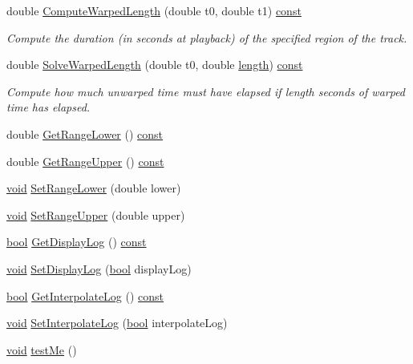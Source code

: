 \begin{DoxyCompactItemize}
$$double \hyperlink{class_time_track_ad8a3efc750c22ca2387d4ea41343c86b}{Compute\+Warped\+Length} (double t0, double t1) \hyperlink{getopt1_8c_a2c212835823e3c54a8ab6d95c652660e}{const} 
\begin{DoxyCompactList}\small\item\em Compute the duration (in seconds at playback) of the specified region of the track. \end{DoxyCompactList}\item 
double \hyperlink{class_time_track_a76fa0dc4d125c058f9d7ae580bd07c28}{Solve\+Warped\+Length} (double t0, double \hyperlink{test__lib_f_l_a_c_2format_8c_ac94dc16b22556ba5fa815655f27442da}{length}) \hyperlink{getopt1_8c_a2c212835823e3c54a8ab6d95c652660e}{const} 
\begin{DoxyCompactList}\small\item\em Compute how much unwarped time must have elapsed if length seconds of warped time has elapsed. \end{DoxyCompactList}\item 
double \hyperlink{class_time_track_a4b1f56611ba90a95691a0b47107e4d22}{Get\+Range\+Lower} () \hyperlink{getopt1_8c_a2c212835823e3c54a8ab6d95c652660e}{const} 
\item 
double \hyperlink{class_time_track_a8d16c30d6a49657b1e3125ba16a3fae8}{Get\+Range\+Upper} () \hyperlink{getopt1_8c_a2c212835823e3c54a8ab6d95c652660e}{const} 
\item 
\hyperlink{sound_8c_ae35f5844602719cf66324f4de2a658b3}{void} \hyperlink{class_time_track_aa5896d68ea4f71d80c7cda10438394a7}{Set\+Range\+Lower} (double lower)
\item 
\hyperlink{sound_8c_ae35f5844602719cf66324f4de2a658b3}{void} \hyperlink{class_time_track_aff49fb8cb170a1b8343ed719abb96e49}{Set\+Range\+Upper} (double upper)
\item 
\hyperlink{mac_2config_2i386_2lib-src_2libsoxr_2soxr-config_8h_abb452686968e48b67397da5f97445f5b}{bool} \hyperlink{class_time_track_abae5d14db9f5a3f3ffc6c6c99278ed3a}{Get\+Display\+Log} () \hyperlink{getopt1_8c_a2c212835823e3c54a8ab6d95c652660e}{const} 
\item 
\hyperlink{sound_8c_ae35f5844602719cf66324f4de2a658b3}{void} \hyperlink{class_time_track_a3a7af38b8f18f64cf2939d97c634ac37}{Set\+Display\+Log} (\hyperlink{mac_2config_2i386_2lib-src_2libsoxr_2soxr-config_8h_abb452686968e48b67397da5f97445f5b}{bool} display\+Log)
\item 
\hyperlink{mac_2config_2i386_2lib-src_2libsoxr_2soxr-config_8h_abb452686968e48b67397da5f97445f5b}{bool} \hyperlink{class_time_track_a270946a57e6c2992edcdf6848a6a3780}{Get\+Interpolate\+Log} () \hyperlink{getopt1_8c_a2c212835823e3c54a8ab6d95c652660e}{const} 
\item 
\hyperlink{sound_8c_ae35f5844602719cf66324f4de2a658b3}{void} \hyperlink{class_time_track_a1c9c8dafcbfd6887a731edbd8c63fa44}{Set\+Interpolate\+Log} (\hyperlink{mac_2config_2i386_2lib-src_2libsoxr_2soxr-config_8h_abb452686968e48b67397da5f97445f5b}{bool} interpolate\+Log)
\item 
\hyperlink{sound_8c_ae35f5844602719cf66324f4de2a658b3}{void} \hyperlink{class_time_track_a9ac9a629360ae911839bcd49fc88a85d}{test\+Me} ()
\end{DoxyCompactItemize}
